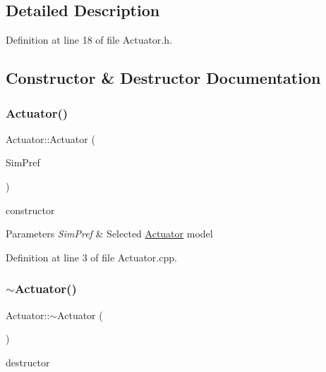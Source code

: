 \subsection{Detailed Description}


Definition at line 18 of file Actuator.\+h.



\subsection{Constructor \& Destructor Documentation}
\mbox{\label{class_actuator_a136af3d7d681d8c445e5d4ce552e4741}} 
\subsubsection{\texorpdfstring{Actuator()}{Actuator()}}
{\footnotesize\ttfamily Actuator\+::\+Actuator (\begin{DoxyParamCaption}\item[{Sim\+D\+Preference \&}]{Sim\+Pref }\end{DoxyParamCaption})}



constructor 


\begin{DoxyParams}{Parameters}
{\em Sim\+Pref} & Selected \hyperlink{class_actuator}{Actuator} model \\
\hline
\end{DoxyParams}


Definition at line 3 of file Actuator.\+cpp.

\mbox{\label{class_actuator_a3c19e3031076395a918ab72e1acc8a3c}} 
\subsubsection{\texorpdfstring{$\sim$\+Actuator()}{~Actuator()}}
{\footnotesize\ttfamily Actuator\+::$\sim$\+Actuator (\begin{DoxyParamCaption}{ }\end{DoxyParamCaption})}



destructor 



